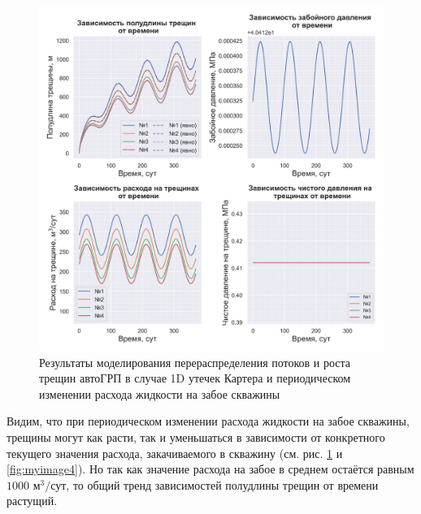 \begin{figure}[H] 
\center
\includegraphics[width=\linewidth]{images/myimage3.jpg}
\caption{Результаты моделирования перераспределения потоков и роста трещин автоГРП в случае 1D утечек Картера и периодическом изменении расхода жидкости на забое скважины} 
\label{fig:myimage3}
\end{figure}

Видим, что при периодическом изменении расхода жидкости на забое скважины, трещины могут как расти, так и уменьшаться в зависимости от конкретного текущего значения расхода, закачиваемого в скважину (см. рис. \ref{fig:myimage3} и \ref{fig:myimage4}).
Но так как значение расхода на забое в среднем остаётся равным $1000\text{ м}^3/\text{сут}$, то общий тренд зависимостей полудлины трещин от времени растущий.

